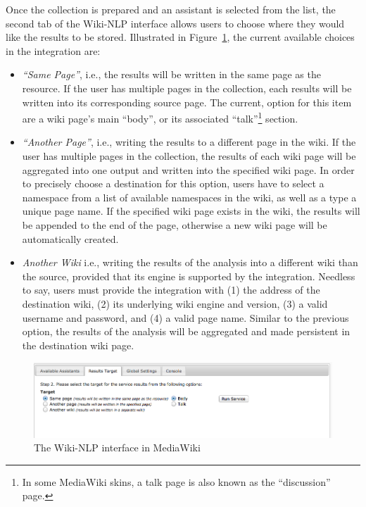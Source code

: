 Once the collection is prepared and an assistant is selected from the list, the second tab of the Wiki-NLP interface allows users to choose where they would like the results to be stored. Illustrated in Figure~\ref{fig:semassist_target}, the current available choices in the integration are:

\begin{itemize}\itemsep1mm
\item \emph{``Same Page''}, i.e., the results will be written in the same page as the resource. If the user has multiple pages in the collection, each results will be written into its corresponding source page. The current, option for this item are a wiki page's main ``body'', or its associated ``talk''\footnote{In some MediaWiki skins, a talk page is also known as the ``discussion'' page.} section.
\item \emph{``Another Page''}, i.e., writing the results to a different page in the wiki. If the user has multiple pages in the collection, the results of each wiki page will be aggregated into one output and written into the specified wiki page. In order to precisely choose a destination for this option, users have to select a namespace from a list of available namespaces in the wiki, as well as a type a unique page name. If the specified wiki page exists in the wiki, the results will be appended to the end of the page, otherwise a new wiki page will be automatically created.
\item \emph{Another Wiki} i.e., writing the results of the analysis into a different wiki than the source, provided that its engine is supported by the integration. Needless to say, users must provide the integration with (1) the address of the destination wiki, (2) its underlying wiki engine and version, (3) a valid username and password, and (4) a valid page name. Similar to the previous option, the results of the analysis will be aggregated and made persistent in the destination wiki page.
\end{itemize}

\begin{figure}
\centering
\includegraphics[width=\textwidth]{pictures/semassist_target.png}
\caption{The Wiki-NLP interface in MediaWiki}
\label{fig:semassist_target}
\end{figure}

